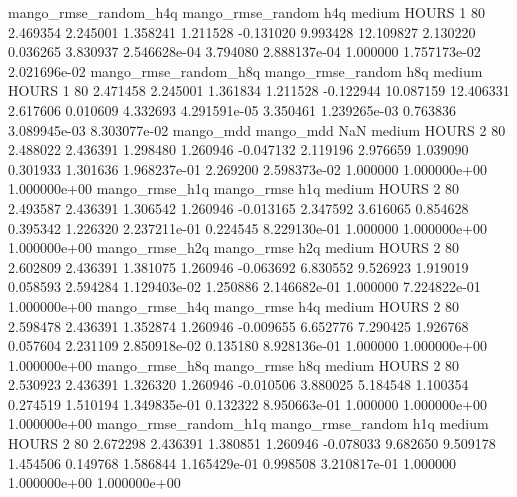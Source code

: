 mango_rmse_random_h4q mango_rmse_random                  h4q     medium    HOURS                 1 80  2.469354       2.245001 1.358241       1.211528   -0.131020      9.993428     12.109827     2.130220       0.036265  3.830937 2.546628e-04     3.794080   2.888137e-04            1.000000    1.757173e-02        2.021696e-02
mango_rmse_random_h8q mango_rmse_random                  h8q     medium    HOURS                 1 80  2.471458       2.245001 1.361834       1.211528   -0.122944     10.087159     12.406331     2.617606       0.010609  4.332693 4.291591e-05     3.350461   1.239265e-03            0.763836    3.089945e-03        8.303077e-02
            mango_mdd         mango_mdd                  NaN     medium    HOURS                 2 80  2.488022       2.436391 1.298480       1.260946   -0.047132      2.119196      2.976659     1.039090       0.301933  1.301636 1.968237e-01     2.269200   2.598373e-02            1.000000    1.000000e+00        1.000000e+00
       mango_rmse_h1q        mango_rmse                  h1q     medium    HOURS                 2 80  2.493587       2.436391 1.306542       1.260946   -0.013165      2.347592      3.616065     0.854628       0.395342  1.226320 2.237211e-01     0.224545   8.229130e-01            1.000000    1.000000e+00        1.000000e+00
       mango_rmse_h2q        mango_rmse                  h2q     medium    HOURS                 2 80  2.602809       2.436391 1.381075       1.260946   -0.063692      6.830552      9.526923     1.919019       0.058593  2.594284 1.129403e-02     1.250886   2.146682e-01            1.000000    7.224822e-01        1.000000e+00
       mango_rmse_h4q        mango_rmse                  h4q     medium    HOURS                 2 80  2.598478       2.436391 1.352874       1.260946   -0.009655      6.652776      7.290425     1.926768       0.057604  2.231109 2.850918e-02     0.135180   8.928136e-01            1.000000    1.000000e+00        1.000000e+00
       mango_rmse_h8q        mango_rmse                  h8q     medium    HOURS                 2 80  2.530923       2.436391 1.326320       1.260946   -0.010506      3.880025      5.184548     1.100354       0.274519  1.510194 1.349835e-01     0.132322   8.950663e-01            1.000000    1.000000e+00        1.000000e+00
mango_rmse_random_h1q mango_rmse_random                  h1q     medium    HOURS                 2 80  2.672298       2.436391 1.380851       1.260946   -0.078033      9.682650      9.509178     1.454506       0.149768  1.586844 1.165429e-01     0.998508   3.210817e-01            1.000000    1.000000e+00        1.000000e+00
